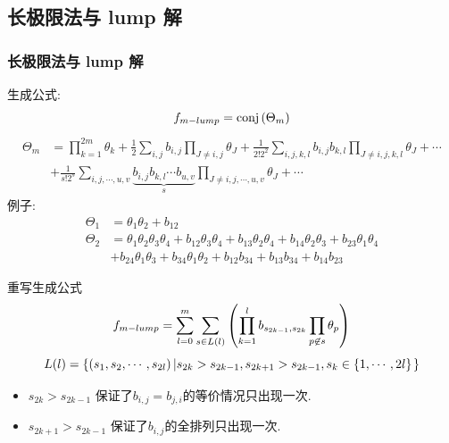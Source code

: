 \subsection{长极限法与 lump 解}
\begin{frame}
\frametitle{长极限法与 lump 解}
生成公式:
\[
    f_{m-lump}={\rm conj}\left(\Theta_m\right)
\]
\[
\begin{aligned}
    \Theta_m&=\prod_{k=1}^{2m}\theta_k+\frac{1}{2}\sum_{i,j}{b_{i,j}}\prod_{J\neq i,j}{\theta_J}+\frac{1}{2! 2^2}\sum_{i,j,k,l}{b_{i,j}b_{k,l}}\prod_{J\neq i,j,k,l}{\theta_{J}}+\cdots \\
    &+\frac{1}{s!2^s}\sum_{i,j,\cdots,u,v}\underbrace{{b_{i,j}b_{k,l}\cdots b_{u,v}}}_{s}\prod_{J\neq i,j,\cdots, u,v}{\theta_J}+\cdots 
\end{aligned}
\]
例子:
\[
\begin{aligned}
\Theta_1&=\theta_{1}\theta_{2}+b_{12} \\
\Theta_2&=\theta_{1}\theta_{2}\theta_{3}\theta_{4}+b_{12}\theta_{3}\theta_{4}+b_{13}\theta_{2}\theta_{4}+b_{14}\theta_{2}\theta_{3}+b_{23}\theta_{1}\theta_{4}\\
&+b_{24}\theta_{1}\theta_{3}+b_{34}\theta_{1}\theta_{2}+b_{12}b_{34}+b_{13}b_{34}+b_{14}b_{23}
\end{aligned}
\]
\end{frame}

\begin{frame}
重写生成公式
\[
    f_{m-lump}=\sum_{l=0}^m\sum_{s\in L(l)}\left(\prod_{k=1}^l{b_{s_{2k-1},s_{2k}}}\prod_{p\not\in s}{\theta_p}\right)
\]
\[
    L(l)=\left\{\left(s_1, s_2, \cdots ,s_{2l}\right)\left|s_{2k}>s_{2k-1},s_{2k+1}>s_{2k-1},s_k\in \left\{1,\cdots,2l\right\}\right.\right\}
\]
\begin{itemize}
\item $s_{2k}>s_{2k-1}$ 保证了$b_{i,j}=b_{j,i}$的等价情况只出现一次. 
\item $s_{2k+1}>s_{2k-1}$ 保证了$b_{i,j}$的全排列只出现一次.
\end{itemize}
\end{frame}

